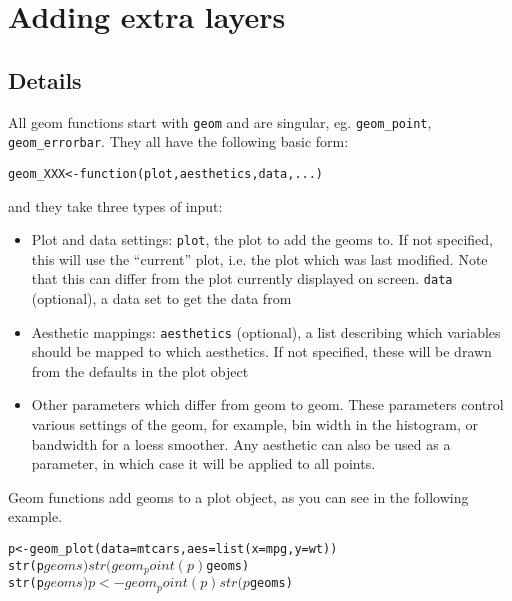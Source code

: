 


\chapter{Adding extra layers}

\section{Details}\label{sec:details}

All geom functions start with {\tt geom} and are singular, eg. {\tt geom\_point}, {\tt geom\_errorbar}.  They all have the following basic form:

\begin{alltt}
geom_XXX <- function(plot, aesthetics, data, ...) {}
\end{alltt}

\noindent and they take three types of input:

\begin{itemize}
	\item Plot and data settings: {\tt plot}, the plot to add the geoms to. If not specified, this will use the ``current'' plot, i.e. the plot which was last modified. Note that this can differ from the plot currently displayed on screen.  {\tt data} (optional), a data set to get the data from
	\item Aesthetic mappings: {\tt aesthetics} (optional), a list describing which variables should be mapped to which aesthetics.  If not specified, these will be drawn from the defaults in the plot object
	\item Other parameters which differ from geom to geom.  These parameters control various settings of the geom, for example, bin width in the histogram, or bandwidth for a loess smoother.  Any aesthetic can also be used as a parameter, in which case it will be applied to all points.
\end{itemize}

Geom functions add geoms to a plot object, as you can see in the following example.

\begin{alltt}
p <- geom_plot(data=mtcars, aes=list(x=mpg, y=wt))
str(p$geoms) 
str(geom_point(p)$geoms)
str(p$geoms)
p <- geom_point(p)
str(p$geoms)
\end{alltt}

